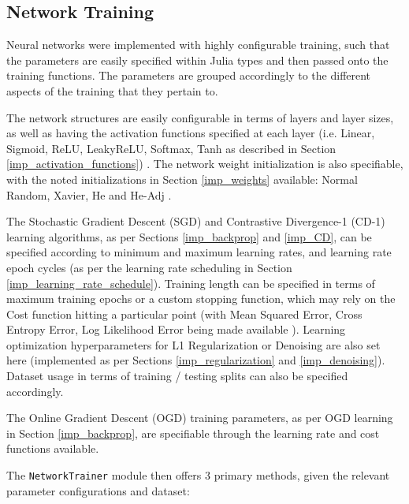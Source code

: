 \documentclass[a4paper,11pt,oneside]{article}
\theoremstyle{plain}
\theoremstyle{definition}
\begin{document}
	
	\subsection{Network Training}
	
	Neural networks were implemented with highly configurable training, such that the parameters are easily specified within Julia types \citep{DCTrainingStructures} and then passed onto the training functions. The parameters are grouped accordingly to the different aspects of the training that they pertain to. \newline
	
	The network structures are easily configurable in terms of layers and layer sizes, as well as having the activation functions specified at each layer (i.e. Linear, Sigmoid, ReLU, LeakyReLU, Softmax, Tanh as described in Section \ref{imp_activation_functions}) \citep{DCActivationFunctions}. The network weight initialization is also specifiable, with the noted initializations in Section \ref{imp_weights} available: Normal Random, Xavier, He and He-Adj \citep{DCInitializationFunctions}.\newline
	
	The Stochastic Gradient Descent (SGD) and Contrastive Divergence-1 (CD-1) learning algorithms, as per Sections \ref{imp_backprop} and \ref{imp_CD}, can be specified according to minimum and maximum learning rates, and learning rate epoch cycles (as per the learning rate scheduling in Section \ref{imp_learning_rate_schedule}). Training length can be specified in terms of maximum training epochs or a custom stopping function, which may rely on the Cost function hitting a particular point (with Mean Squared Error, Cross Entropy Error, Log Likelihood Error being made available \citep{DCCostFunctions}). Learning optimization hyperparameters for L1 Regularization or Denoising are also set here (implemented as per Sections \ref{imp_regularization} and \ref{imp_denoising}). Dataset usage in terms of training / testing splits can also be specified accordingly.\newline
	
	The Online Gradient Descent (OGD) training parameters, as per OGD learning in Section \ref{imp_backprop}, are specifiable through the learning rate and cost functions available.\newline
	
	The \texttt{NetworkTrainer} module \citep{DCNetworkTrainer} then offers 3 primary methods, given the relevant parameter configurations and dataset:
	
\end{document}

